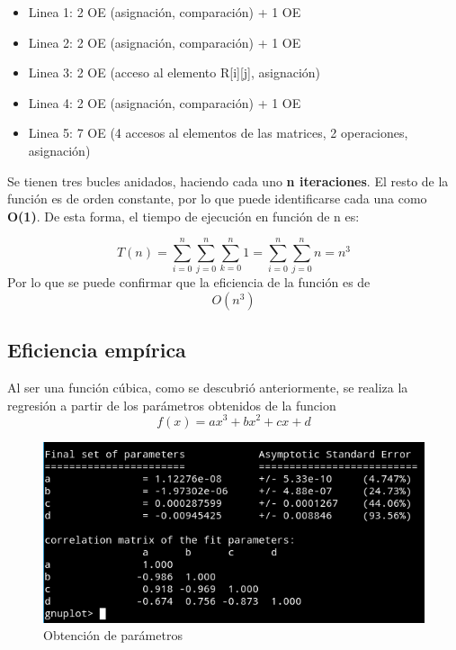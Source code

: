 \begin{itemize}
	\item Linea 1: 2 OE (asignación, comparación) + 1 OE
	\item Linea 2: 2 OE (asignación, comparación) + 1 OE	
	\item Linea 3: 2 OE (acceso al elemento R[i][j], asignación)
	\item Linea 4: 2 OE (asignación, comparación) + 1 OE
	\item Linea 5: 7 OE (4 accesos al elementos de las matrices, 2 operaciones, asignación)
\end{itemize}
Se tienen tres bucles anidados, haciendo cada uno \textbf{n iteraciones}. El resto de la función es de orden constante, por lo que puede identificarse cada una como \textbf{O(1)}. De esta forma, el tiempo de ejecución en función de n es:

\begin{equation}
T(n)=\sum_{i=0}^{n}\sum_{j=0}^{n}\sum_{k=0}^{n}1= \sum_{i=0}^{n}\sum_{j=0}^{n}n=n^3
\end{equation}
Por lo que se puede confirmar que la eficiencia de la función es de 
\begin{equation}
O(n^3)
\end{equation}


\newpage
\subsection{Eficiencia empírica}

Al ser una función cúbica, como se descubrió anteriormente, se realiza la regresión a partir
de los parámetros obtenidos de la funcion 
\begin{equation}
f(x) = ax^3 + bx^2 + cx + d
\end{equation}

\begin{figure}[H] %
\centering
\includegraphics[scale=0.8]{ejercicio7/fit.png}  
\caption{Obtención de parámetros} 
\label{fig:figura7-1}
\end{figure}

